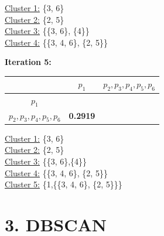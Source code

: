 \documentclass[11pt]{article}
\begin{document}
	\underline{Cluster 1:} \{3, 6\} \\
	\underline{Cluster 2:} \{2, 5\} \\
	\underline{Cluster 3:} \{\{3, 6\}, \{4\}\} \\
	\underline{Cluster 4:} \{\{3, 4, 6\}, \{2, 5\}\}
	
	\vspace{5mm}
	
	\textbf{Iteration 5:}
	
	\begin{center}
    	\begin{adjustbox}{max width=\textwidth}
		\begin{tabular}{ | c | c | c|}
	  	 	\hline

	  	 	& \textbf{$p_1$} & \textbf{$p_2, p_3, p_4, p_5, p_6$}\\
	  	 	\hline
	  	 	
	  	 	\textbf{$p_1$} &  &\\
	  	 	\hline
	  	 	
	  	 	\textbf{$p_2, p_3, p_4, p_5, p_6$} & \textbf{0.2919} &\\
	  	 	\hline
    		\end{tabular}
    	\end{adjustbox}
	\end{center}
	
	\underline{Cluster 1:} \{3, 6\} \\
	\underline{Cluster 2:} \{2, 5\} \\
	\underline{Cluster 3:} \{\{3, 6\},\{4\}\} \\
	\underline{Cluster 4:} \{\{3, 4, 6\}, \{2, 5\}\} \\
	\underline{Cluster 5:} \{1,\{\{3, 4, 6\}, \{2, 5\}\}\}

	\section*{3. DBSCAN}
\end{document}
